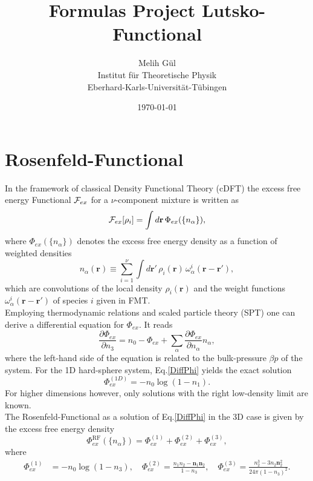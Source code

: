 \documentclass{article}
\title{Formulas Project Lutsko-Functional}
\author{Melih G\"ul  \\
	Institut f\"ur Theoretische Physik \\
	Eberhard-Karls-Universit\"at-T\"ubingen  \\
	}
\date{\today}
\begin{document}
\maketitle


\section{Rosenfeld-Functional}

In the framework of classical Density Functional Theory (cDFT) the excess free energy Functional ${\cal F}_{ex}$ for a $\nu$-component mixture is written as
\begin{equation}
	{\cal F}_{ex}[\rho_i] = \int d\mathbf{r}\,\Phi_{ex}(\{n_\alpha\}),
\end{equation}
where $\Phi_{ex}(\{n_\alpha\})$ denotes the excess free energy density as a function of weighted densities
\begin{equation}
	n_\alpha(\mathbf{r}) \equiv \sum_{i=1}^\nu\int d\mathbf{r}'\,\rho_i(\mathbf{r})\,\omega^i_\alpha(\mathbf{r}-\mathbf{r}'),
\end{equation} 
which are convolutions of the local density $\rho_i(\mathbf{r})$ and the weight functions $\omega^i_\alpha(\mathbf{r}-\mathbf{r}')$ of species $i$ given in FMT.\\
Employing thermodynamic relations and scaled particle theory (SPT) one can derive a differential equation for $\Phi_{ex}$. It reads
\begin{equation}\label{DiffPhi}
	\frac{\partial\Phi_{ex}}{\partial n_3} = n_0-\Phi_{ex}+\sum_\alpha\frac{\partial\Phi_{ex}}{\partial n_\alpha}n_\alpha,
\end{equation}
where the left-hand side of the equation is related to the bulk-pressure $\beta p$ of the system.
For the 1D hard-sphere system, Eq.\eqref{DiffPhi} yields the exact solution 
\begin{equation}
	\Phi_{ex}^{(1D)} = -n_0\log(1-n_1).
\end{equation}
For higher dimensions however, only solutions with the right low-density limit are known.\\ 
The Rosenfeld-Functional as a solution of Eq.\eqref{DiffPhi} in the 3D case is given by the excess free energy density 
\begin{equation}
	\Phi^{\text{RF}}_{ex}(\{n_\alpha\}) = \Phi_{ex}^{(1)}+\Phi_{ex}^{(2)}+\Phi_{ex}^{(3)},
\end{equation}
where
\begin{align}\label{Rosenfeld}
	\Phi_{ex}^{(1)} &= -n_0\log(1-n_3),\quad
	\Phi_{ex}^{(2)} = \frac{n_1 n_2-\mathbf{n}_1 \mathbf{n}_2}{1-n_3},\quad
	\Phi_{ex}^{(3)} = \frac{n_2^3 - 3n_2\mathbf{n}_2^2}{24\pi (1-n_3)^2}.
\end{align}
\end{document}
